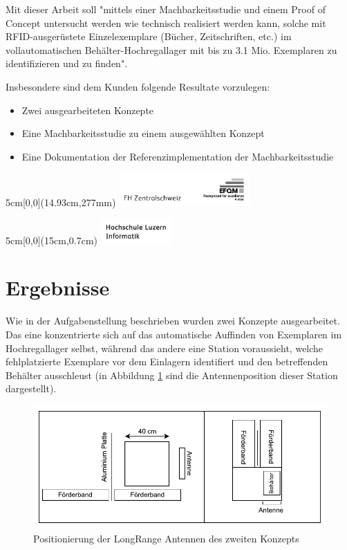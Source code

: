 \documentclass[
	a4paper
]{scrartcl}
\begin{document}
Mit dieser Arbeit soll "mittels einer Machbarkeitsstudie und einem Proof of Concept untersucht werden wie technisch realisiert werden kann, solche mit RFID-ausgerüstete Einzel\-exemplare (Bücher, Zeitschriften, etc.) im vollautomatischen Behälter-Hochregallager mit bis zu 3.1 Mio. Exemplaren zu identifizieren und zu finden".

Insbesondere sind dem Kunden folgende Resultate vorzulegen:
\begin{itemize}[noitemsep]
	\item Zwei ausgearbeiteten Konzepte
	\item Eine Machbarkeitsstudie zu einem ausgewählten Konzept
	\item Eine Dokumentation der Referenzimplementation der Machbarkeitsstudie
\end{itemize}

\vspace{0.5em}
\noindent
\begin{textblock*}{5cm}[0,0](14.93cm,277mm)
	\includegraphics[keepaspectratio,width=5cm]{img/FHZ_Logo}
\end{textblock*}

\newpage

\begin{textblock*}{5cm}[0,0](15cm,0.7cm)
	\includegraphics[keepaspectratio,width=2.7cm]{img/HSLU_Logo_Header}
\end{textblock*}

\section{Ergebnisse}
Wie in der Aufgabenstellung beschrieben wurden zwei Konzepte ausgearbeitet. Das eine konzentrierte sich auf das automatische Auffinden von Exemplaren im Hochregallager selbst, während das andere eine Station voraussieht, welche fehlplatzierte Exemplare vor dem Einlagern identifiert und den betreffenden Behälter ausschleust (in Abbildung \ref{fig:PosAntennen} sind die Antennenposition dieser Station dargestellt).

\begin{figure}[htb]
	\centering
	\includegraphics[keepaspectratio,width=\textwidth]{Position_Antennen}
	\caption{Positionierung der LongRange Antennen des zweiten Konzepts}
	\label{fig:PosAntennen}
\end{figure}
\end{document}
